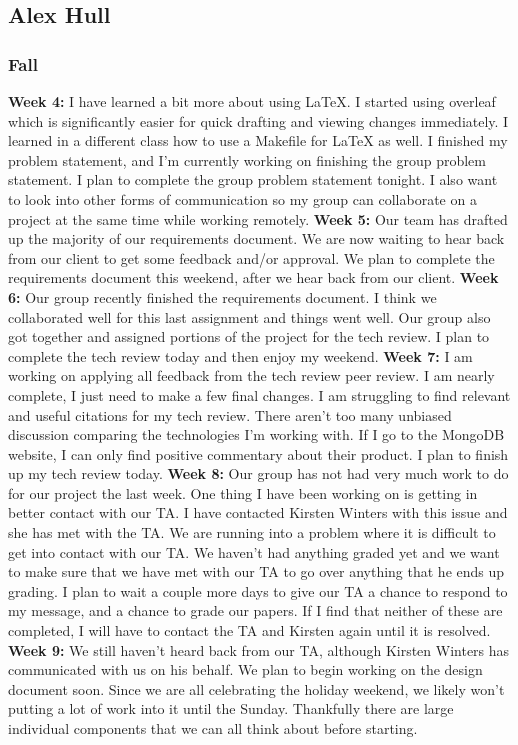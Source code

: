 \documentclass[onecolumn, draftclsnofoot, 10pt, compsoc]{IEEEtran}
\begin{document}
\subsection{Alex Hull}
\subsubsection{Fall}
 
\textbf{Week 4:}
I have learned a bit more about using LaTeX. I started using overleaf which is significantly easier for quick drafting and viewing changes immediately. I learned in a different class how to use a Makefile for LaTeX as well. I finished my problem statement, and I'm currently working on finishing the group problem statement.
I plan to complete the group problem statement tonight. I also want to look into other forms of communication so my group can collaborate on a project at the same time while working remotely.
\newline
\textbf{Week 5:}
Our team has drafted up the majority of our requirements document. We are now waiting to hear back from our client to get some feedback and/or approval. 
We plan to complete the requirements document this weekend, after we hear back from our client. 
\newline
\textbf{Week 6:}
Our group recently finished the requirements document. I think we collaborated well for this last assignment and things went well. Our group also got together and assigned portions of the project for the tech review.
I plan to complete the tech review today and then enjoy my weekend. 
\newline
\textbf{Week 7:}
I am working on applying all feedback from the tech review peer review. I am nearly complete, I just need to make a few final changes. 
I am struggling to find relevant and useful citations for my tech review. There aren't too many unbiased discussion comparing the technologies I'm working with. If I go to the MongoDB website, I can only find positive commentary about their product. 
I plan to finish up my tech review today. 
\newline
\textbf{Week 8:}
Our group has not had very much work to do for our project the last week. One thing I have been working on is getting in better contact with our TA. I have contacted Kirsten Winters with this issue and she has met with the TA. 
We are running into a problem where it is difficult to get into contact with our TA. We haven't had anything graded yet and we want to make sure that we have met with our TA to go over anything that he ends up grading. 
I plan to wait a couple more days to give our TA a chance to respond to my message, and a chance to grade our papers. If I find that neither of these are completed, I will have to contact the TA and Kirsten again until it is resolved. 
\newline
\textbf{Week 9:}
We still haven't heard back from our TA, although Kirsten Winters has communicated with us on his behalf. 
We plan to begin working on the design document soon. Since we are all celebrating the holiday weekend, we likely won't putting a lot of work into it until the Sunday. Thankfully there are large individual components that we can all think about before starting. 
\end{document}
